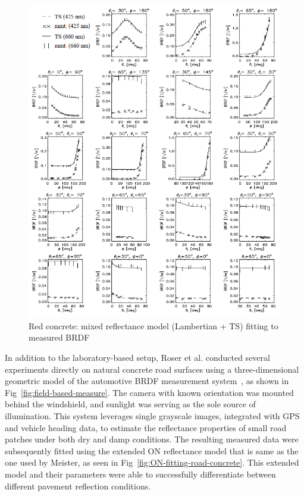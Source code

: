 \begin{figure}[!tb]
    \centering
    \includegraphics[width=0.9\linewidth]{./figures/measurement-literature/CT-fitting-red-concrete.png}
    \caption{Red concrete: mixed reflectance model (Lambertian + TS) fitting to measured BRDF}
    \label{fig:CT-fitting-red-concrete}
\end{figure}

In addition to the laboratory-based setup, Roser et al. conducted several experiments directly on natural concrete road surfaces using a three-dimensional geometric model of the automotive BRDF measurement system~\cite{2010_Roser}, as shown in Fig~\ref{fig:field-based-measure}.
The camera with known orientation was mounted behind the windshield, and sunlight was serving as the sole source of illumination.
This system leverages single grayscale images, integrated with GPS and vehicle heading data, to estimate the reflectance properties of small road patches under both dry and damp conditions.
The resulting measured data were subsequently fitted using the extended ON reflectance model that is same as the one used by Meister, as seen in Fig~\ref{fig:ON-fitting-road-concrete}.
This extended model and their parameters were able to successfully differentiate between different pavement reflection conditions.

